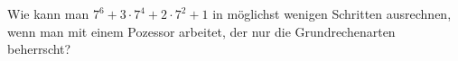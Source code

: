 \item Wie kann man $7^6+3\cdot 7^4+2\cdot7^2+1$ in möglichst wenigen Schritten ausrechnen, wenn man mit einem Pozessor arbeitet, der nur die Grundrechenarten beherrscht?

